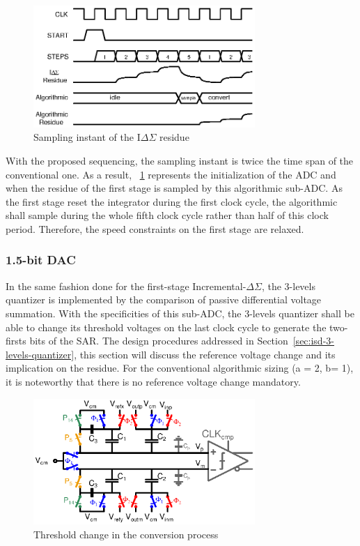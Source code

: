 \begin{figure}[htp]
	\centering
	\includegraphics[width=0.75\textwidth]{Chapter4/Figs/isd-algo-residue-sampling.ps}
	\caption{Sampling instant of the I\(\Delta \Sigma \) residue}
	\label{fig:digital-sampling}
\end{figure}

With the proposed sequencing, the sampling instant is twice the time span of the conventional one. As a result, \figurename~\ref{fig:digital-sampling} represents the initialization of the ADC and when the residue of the first stage is sampled by this algorithmic sub-ADC\@. As the first stage reset the integrator during the first clock cycle, the algorithmic shall sample during the whole fifth clock cycle rather than half of this clock period. Therefore, the speed constraints on the first stage are relaxed.

	\subsubsection{1.5-bit DAC}             %
In the same fashion done for the first-stage Incremental-\(\Delta\Sigma \), the 3-levels quantizer is implemented by the comparison of passive differential voltage summation. With the specificities of this sub-ADC, the 3-levels quantizer shall be able to change its threshold voltages on the last clock cycle to generate the two-firsts bits of the SAR\@. The design procedures addressed in Section~\ref{sec:isd-3-levels-quantizer}, this section will discuss the reference voltage change and its implication on the residue. For the conventional algorithmic sizing (a = 2, b= 1), it is noteworthy that there is no reference voltage change mandatory.

\begin{figure}[htp]
	\centering
	\includegraphics[width=0.75\textwidth]{Chapter4/Figs/algo-passive-adder-comp.ps}
	\caption{Threshold change in the conversion process}
	\label{fig:thresholds-generator}
\end{figure}

